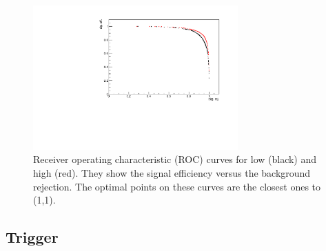 \begin{figure}
\centering
\includegraphics[width=0.7\textwidth]{Lmumu/figs/ROC.pdf}
\caption{Receiver operating characteristic (ROC) curves for low \qsq (black) and high \qsq (red).
They show the signal efficiency versus the background rejection.
The optimal points on these curves are the closest ones to (1,1). }
\label{fig:Lb_ROC}
\end{figure}

%
%




\subsection{Trigger}

